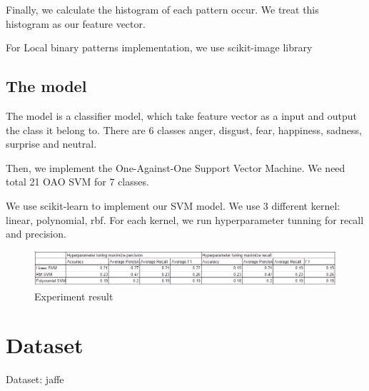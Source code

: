 \documentclass[a4paper, 12pt]{article}
\begin{document}
	Finally, we calculate the histogram of each pattern occur. We treat this histogram as our feature vector.
	
	For Local binary patterns implementation, we use scikit-image library \cite{van2014scikit}
	
	
	
		
\subsection{The model}
	The model is a classifier model, which take feature vector as a input and output the class it belong to. There are 6 classes anger, disgust, fear, happiness, sadness, surprise and neutral.
	
	Then, we implement the One-Against-One Support Vector Machine. We need total 21 OAO SVM for 7 classes.
	
	We use scikit-learn to \cite{pedregosa2011scikit} implement our SVM model. We use 3 different kernel: linear, polynomial, rbf. For each kernel, we run hyperparameter tunning for recall and precision.
	
		\begin{figure}[H]
			\centering
			\includegraphics[width=1\linewidth]{./figure/experiment_result.png}
			\caption[]{Experiment result}
			\label{fig:result}
		\end{figure}
	

\section{Dataset}
Dataset:  jaffe \cite{lyons1998japanese}





\end{document}
